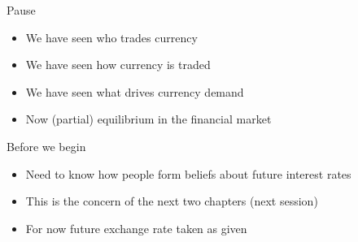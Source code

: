 \documentclass{beamer}
\begin{document}


\begin{frame}{Pause}
    \begin{itemize}
        \item We have seen who trades currency 
        \item We have seen how currency is traded
        \item We have seen what drives currency demand
        \item Now (partial) equilibrium in the financial market
    \end{itemize}
\end{frame}

\begin{frame}{Before we begin}

    \begin{itemize}
        \item Need to know how people form beliefs about future interest rates
        \item This is the concern of the next two chapters (next session)
        \item For now future exchange rate taken as given
    \end{itemize}

\end{frame}
\end{document}
